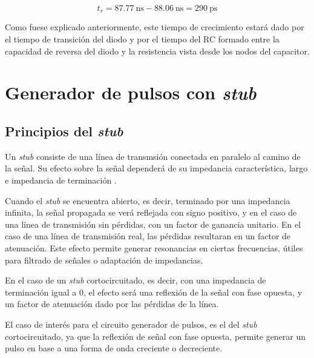 \begin{equation}
    t_r = \qty{87.77}{\nano\second} - \qty{88.06}{\nano\second} =
    \qty{290}{\pico\second}
\end{equation}

Como fuese explicado anteriormente, este
tiempo de crecimiento estará dado por el tiempo de transición del diodo y por el
tiempo del RC formado entre la capacidad de reversa del diodo y la resistencia
vista desde los nodos del capacitor.

\section{Generador de pulsos con \textit{stub}}
\label{sec:generador_pulsos_stub}

\subsection{Principios del \textit{stub}}

Un \textit{stub} consiste de una línea de transmsión conectada en paralelo al
camino de la señal. Su efecto sobre la señal dependerá de su impedancia
característica, largo e impedancia de terminación \cite{pozar2011}.

Cuando el \textit{stub} se encuentra abierto, es decir, terminado por una
impedancia infinita, la señal propagada se verá reflejada con signo positivo, y
en el caso de una línea de transmisión sin pérdidas, con un factor de ganancia
unitario. En el caso de una línea de transmisión real, las pérdidas resultaran
en un factor de atenuación. Este efecto permite generar
resonancias en ciertas frecuencias, útiles para filtrado de señales o adaptación
de impedancias.

En el caso de un \textit{stub} cortocircuitado, es decir, con una impedancia de
terminación igual a $0$, el efecto será una reflexión de la señal con fase
opuesta, y un factor de atenuación dado por las pérdidas de la línea.

El caso de interés para el circuito generador de pulsos, es el del \textit{stub}
cortocircuitado, ya que la reflexión de señal con fase opuesta, permite generar
un pulso en base a una forma de onda creciente o decreciente.

